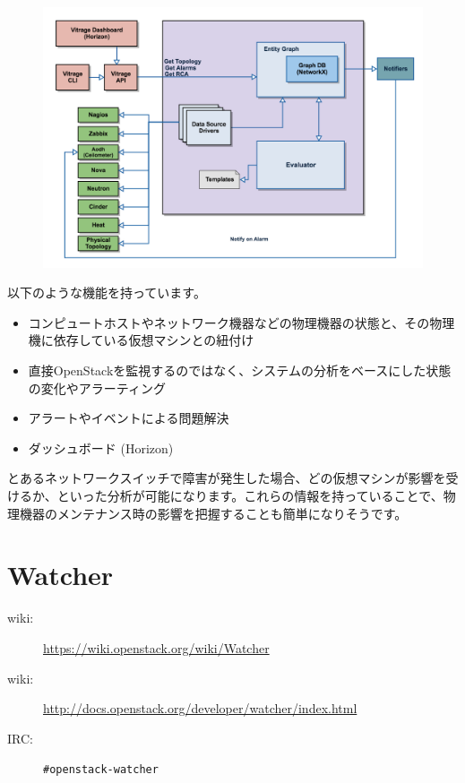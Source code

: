\begin{figure}
	\includegraphics[width=\textwidth]{img/Vitrage-high_level_architecture2.png}
\end{figure}

以下のような機能を持っています。

\begin{itemize}
	\item コンピュートホストやネットワーク機器などの物理機器の状態と、その物理機に依存している仮想マシンとの紐付け
	\item 直接OpenStackを監視するのではなく、システムの分析をベースにした状態の変化やアラーティング
	\item アラートやイベントによる問題解決
	\item ダッシュボード (Horizon)
\end{itemize}

とあるネットワークスイッチで障害が発生した場合、どの仮想マシンが影響を受けるか、といった分析が可能になります。これらの情報を持っていることで、物理機器のメンテナンス時の影響を把握することも簡単になりそうです。

\section{Watcher}

\begin{description}
	\item[wiki:] \url{https://wiki.openstack.org/wiki/Watcher}
	\item[wiki:] \url{http://docs.openstack.org/developer/watcher/index.html}
	\item[IRC:] \verb|#openstack-watcher|
\end{description}

